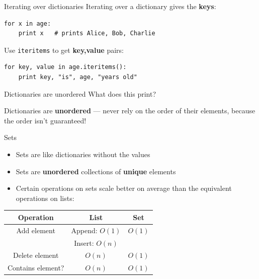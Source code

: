 \begin{frame}[fragile]{Iterating over dictionaries}
	\pause Iterating over a dictionary gives the \textbf{keys}:
	\begin{lstlisting}
for x in age:
    print x   # prints Alice, Bob, Charlie
	\end{lstlisting}
	\pause Use \lstinline{iteritems} to get \textbf{key,value} pairs:
	\begin{lstlisting}
for key, value in age.iteritems():
    print key, "is", age, "years old"
	\end{lstlisting}
\end{frame}

\begin{frame}{Dictionaries are unordered}
	\pause What does this print?
	
	\pause Dictionaries are \textbf{unordered} --- never rely on the order of their elements,
		because the order isn't guaranteed!
\end{frame}

\begin{frame}{Sets}
	\begin{itemize}
		\pause\item Sets are like dictionaries without the values
		\pause\item Sets are \textbf{unordered} collections of \textbf{unique} elements
		\pause\item Certain operations on sets scale better on average than the equivalent operations on lists:
	\end{itemize}
	\pause
	\begin{center}
		\begin{tabular}{|c|c|c|}
			\hline
			\textbf{Operation} & \textbf{List} & \textbf{Set} \\\hline
			Add element & Append: $O(1)$ & $O(1)$ \\
			& Insert: $O(n)$ & \\\hline
			Delete element & $O(n)$ & $O(1)$ \\\hline
			Contains element? & $O(n)$ & $O(1)$ \\\hline
		\end{tabular}
	\end{center}
\end{frame}
